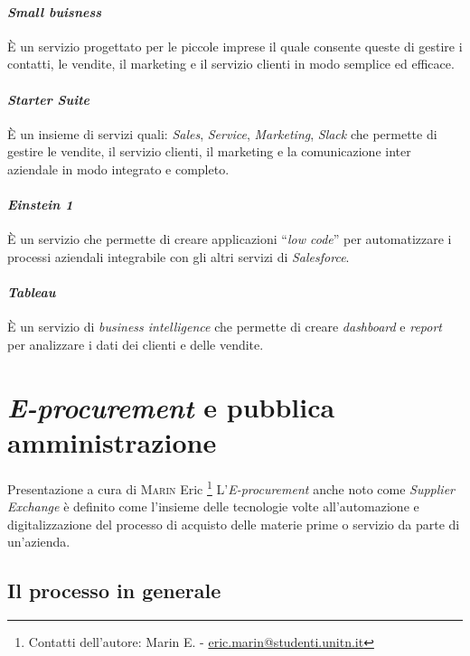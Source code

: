 {{        \paragraph{\textit{Small buisness}} È un servizio progettato per le piccole imprese il quale consente queste di gestire i contatti, le vendite, il marketing e il servizio clienti in modo semplice ed efficace.
        \paragraph{\textit{Starter Suite}} È un insieme di servizi quali: \textit{Sales}, \textit{Service}, \textit{Marketing}, \textit{Slack} che permette di gestire le vendite, il servizio clienti, il marketing e la comunicazione inter aziendale in modo integrato e completo.
        \paragraph{\textit{Einstein 1}} È un servizio che permette di creare applicazioni ``\textit{low code}'' per automatizzare i processi aziendali integrabile con gli altri servizi di \textit{Salesforce}.
        \paragraph{\textit{Tableau}} È un servizio di \textit{business intelligence} che permette di creare \textit{dashboard} e \textit{report} per analizzare i dati dei clienti e delle vendite.
\newpage
\section{\textit{E-procurement} e pubblica amministrazione}
{\footnotesize Presentazione a cura di \textsc{Marin} Eric \footnote{Contatti dell'autore: Marin E. - \href{mailto:eric.marin@studenti.unitn.it}{eric.marin@studenti.unitn.it}}}
    L'\textit{E-procurement} anche noto come \textit{Supplier Exchange} è definito come l'insieme delle tecnologie volte all'automazione e digitalizzazione del processo di acquisto delle materie prime o servizio da parte di un'azienda.
    \subsection{Il processo in generale}
}}
